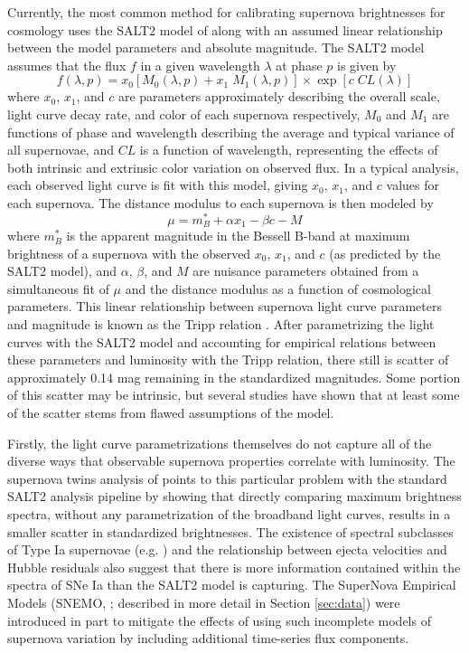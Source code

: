 Currently, the most common method for calibrating supernova brightnesses for cosmology uses the SALT2 model of \cite{Guy2007} along with an assumed linear relationship between the model parameters and absolute magnitude. The SALT2 model assumes that the flux $f$ in a given wavelength $\lambda$ at phase $p$ is given by
\begin{equation}
    f(\lambda, p) = x_0 \left[M_0(\lambda, p) + x_1\;M_1(\lambda, p)\right] \times \exp\left[c\;CL(\lambda)\right]
    \label{eqn:salt_flux_model}
\end{equation}
where $x_0$, $x_1$, and $c$ are parameters approximately describing the overall scale, light curve decay rate, and color of each supernova respectively, $M_0$ and $M_1$ are functions of phase and wavelength describing the average and typical variance of all supernovae, and $CL$ is a function of wavelength, representing the effects of both intrinsic and extrinsic color variation on observed flux. In a typical analysis, each observed light curve is fit with this model, giving $x_0$, $x_1$, and $c$ values for each supernova. The distance modulus to each supernova is then modeled by
\begin{equation}
    \mu = m_B^* + \alpha x_1 -\beta c - M
\end{equation}
where $m_B^*$ is the apparent magnitude in the Bessell B-band at maximum brightness of a supernova with the observed $x_0$, $x_1$, and $c$ (as predicted by the SALT2 model), and $\alpha$, $\beta$, and $M$ are nuisance parameters obtained from a simultaneous fit of $\mu$ and the distance modulus as a function of cosmological parameters. This linear relationship between supernova light curve parameters and magnitude is known as the Tripp relation \citep{Tripp1999}. After parametrizing the light curves with the SALT2 model and accounting for empirical relations between these parameters and luminosity with the Tripp relation, there still is scatter of approximately 0.14 mag remaining in the standardized magnitudes. Some portion of this scatter may be intrinsic, but several studies have shown that at least some of the scatter stems from flawed assumptions of the model.

Firstly, the light curve parametrizations themselves do not capture all of the diverse ways that observable supernova properties correlate with luminosity. The supernova twins analysis of \cite{Fakhouri2015} points to this particular problem with the standard SALT2 analysis pipeline by showing that directly comparing maximum brightness spectra, without any parametrization of the broadband light curves, results in a smaller scatter in standardized brightnesses. The existence of spectral subclasses of Type Ia supernovae (e.g. \cite{Branch2006}) and the relationship between ejecta velocities and Hubble residuals \citep{Siebert2020} also suggest that there is more information contained within the spectra of SNe Ia than the SALT2 model is capturing. The SuperNova Empirical Models (SNEMO, \cite{Saunders2018}; described in more detail in Section \ref{sec:data}) were introduced in part to mitigate the effects of using such incomplete models of supernova variation by including additional time-series flux components.

